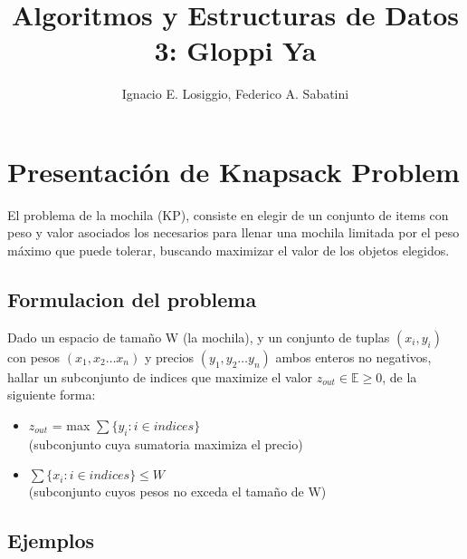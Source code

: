 \documentclass[fleqn, 11pt]{article}
\title{Algoritmos y Estructuras de Datos 3: Gloppi Ya}
\author{Ignacio E. Losiggio, Federico A. Sabatini}
\begin{document}
\maketitle

\tableofcontents

\section{Presentación de Knapsack Problem}

El problema de la mochila (KP), consiste en elegir de un conjunto de items con
peso y valor asociados los necesarios para llenar una mochila limitada por el
peso máximo que puede tolerar, buscando maximizar el valor de los objetos
elegidos.

\subsection{Formulacion del problema}

Dado un espacio de tamaño W (la mochila), y un conjunto de tuplas $(x_i, y_i)$
con pesos $(x_1, x_2 \dots x_n)$ y precios $(y_1, y_2 \dots y_n)$ ambos enteros
no negativos, hallar un subconjunto de indices que maximize el valor $z_{out}
\in\mathbb{E} \geq 0$, de la siguiente forma:

\begin{itemize}
	\item $z_{out} $ = max $\sum \{ y_i : i \in indices \}$ \\
		(subconjunto cuya sumatoria maximiza el precio)
	\item $\sum \{ x_i : i \in indices \} \le W $ \\
		(subconjunto cuyos pesos no exceda el tamaño de W)
\end{itemize}

\subsection{Ejemplos}
\end{document}
